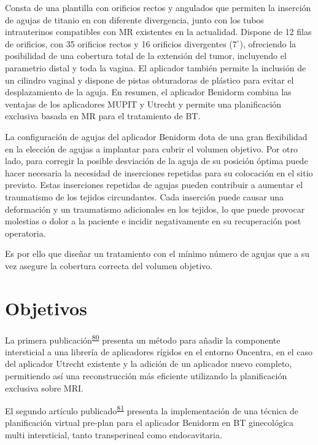 \documentclass[
  a4paper,
]{scrreprt}
\begin{document}
Consta de una plantilla con orificios rectos y angulados que permiten la
inserción de agujas de titanio en con diferente divergencia, junto con
los tubos intrauterinos compatibles con MR existentes en la actualidad.
Dispone de 12 filas de orificios, con 35 orificios rectos y 16 orificios
divergentes (\(7^{\circ}\)), ofreciendo la posibilidad de una cobertura
total de la extensión del tumor, incluyendo el parametrio distal y toda
la vagina. El aplicador también permite la inclusión de un cilindro
vaginal y dispone de pistas obturadoras de plástico para evitar el
desplazamiento de la aguja. En resumen, el aplicador Benidorm combina
las ventajas de los aplicadores MUPIT y Utrecht y permite una
planificación exclusiva basada en MR para el tratamiento de BT.

La configuración de agujas del aplicador Benidorm dota de una gran
flexibilidad en la elección de agujas a implantar para cubrir el volumen
objetivo. Por otro lado, para corregir la posible desviación de la aguja
de su posición óptima puede hacer necesaria la necesidad de inserciones
repetidas para su colocación en el sitio previsto. Estas inserciones
repetidas de agujas pueden contribuir a aumentar el traumatismo de los
tejidos circundantes. Cada inserción puede causar una deformación y un
traumatismo adicionales en los tejidos, lo que puede provocar molestias
o dolor a la paciente e incidir negativamente en su recuperación post
operatoria.

Es por ello que diseñar un tratamiento con el mínimo número de agujas
que a su vez asegure la cobertura correcta del volumen objetivo.

\hypertarget{objetivos}{%
\section{Objetivos}\label{objetivos}}

La primera
publicación\textsuperscript{\protect\hyperlink{ref-otal2017}{80}}
presenta un método para añadir la componente intersticial a una librería
de aplicadores rígidos en el entorno Oncentra, en el caso del aplicador
Utrecht existente y la adición de un aplicador nuevo completo,
permitiendo así una reconstrucción más eficiente utilizando la
planificación exclusiva sobre MRI.

El segundo artículo
publicado\textsuperscript{\protect\hyperlink{ref-rodriguez2017}{81}}
presenta la implementación de una técnica de planificación virtual
pre-plan para el aplicador Benidorm en BT ginecológica multi
intersticial, tanto transperineal como endocavitaria.
\end{document}
